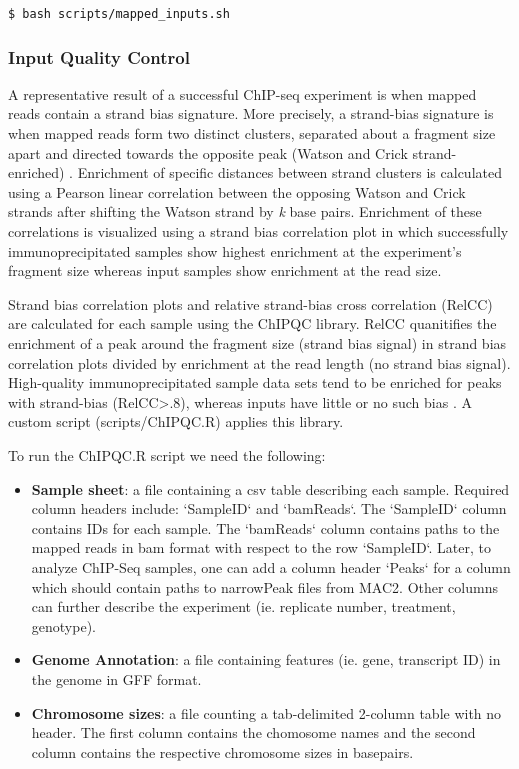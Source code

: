 \documentclass{article}
\begin{document}
\begin{sloppypar}
\begin{verbatim}
$ bash scripts/mapped_inputs.sh
\end{verbatim}

\subsubsection{Input Quality Control}

A representative result of a successful ChIP-seq experiment is when mapped reads contain a strand bias signature. More precisely, a strand-bias signature is when mapped reads form two distinct clusters, separated about a fragment size apart and  directed towards the opposite peak (Watson and Crick strand-enriched) \cite{Landt2012}. Enrichment of specific distances between strand clusters is calculated using a Pearson linear correlation between the opposing Watson and Crick strands after shifting the Watson strand by \textit{k} base pairs. Enrichment of these correlations is visualized using a strand bias correlation plot in which successfully immunoprecipitated samples show highest enrichment at the experiment's fragment size whereas input samples show enrichment at the read size. 


 Strand bias correlation plots and relative strand-bias cross correlation (RelCC) are calculated for each sample using the ChIPQC library. RelCC quanitifies the enrichment of a peak around the fragment size (strand bias signal) in strand bias correlation plots divided by enrichment at the read length (no strand bias signal).  High-quality immunoprecipitated sample data sets tend to be enriched for peaks with strand-bias (RelCC>.8), whereas inputs have little or no such bias \cite{Landt2012}. A custom script ({\selectfont scripts/ChIPQC.R}) applies this library. 
 
To run the ChIPQC.R script we need the following:
\begin{itemize}
  \item \textbf{Sample sheet}: a file containing a csv table describing each sample. Required column headers include: `SampleID` and `bamReads`. The `SampleID` column contains IDs for each sample. The `bamReads` column contains paths to the mapped reads in bam format with respect to the row `SampleID`. Later, to analyze ChIP-Seq samples, one can add a column header `Peaks` for a column which should contain paths to narrowPeak files from MAC2. Other columns can further describe the experiment (ie. replicate number, treatment, genotype).
  \item \textbf{Genome Annotation}: a file containing features (ie. gene, transcript ID) in the genome in GFF format.
  \item \textbf{Chromosome sizes}: a file counting a tab-delimited 2-column table with no header. The first column contains the chomosome names and the second column contains the respective chromosome sizes in basepairs.
\end{itemize}


\end{sloppypar}
\end{document}
